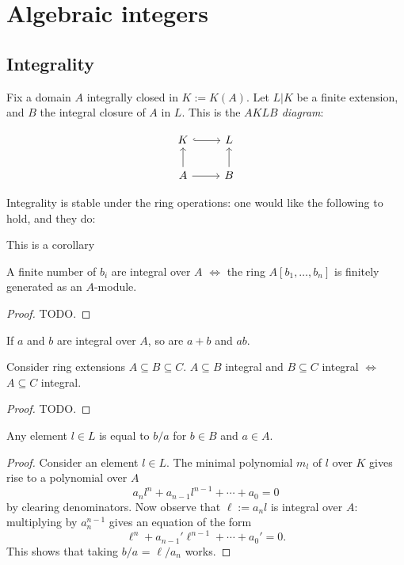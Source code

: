 \documentclass{memoir}
\begin{document}
\chapter{Algebraic integers}

\section{Integrality}

Fix a domain $A$ integrally closed in $K := K(A)$. Let $L|K$ be a finite
extension, and $B$ the integral closure of $A$ in $L$. This is the \emph{$AKLB$
  diagram}:

\[
  \begin{tikzcd}
    K \arrow[r, hook] & L \\
    A \arrow[u] \arrow[r] & B \arrow[u]
  \end{tikzcd}
\]

Integrality is stable under the ring operations: one would like the following to
hold, and they do:

This is a corollary

\begin{theorem}{\label{module-integrality}}
  A finite number of $b_i$ are integral over $A$ $\iff$ the ring $A[b_1,\ldots,b_n]$ is
  finitely generated as an $A$-module.
\end{theorem}
\begin{proof}
  TODO.
\end{proof}

\begin{corollary}{\label{integrality-of-sums-products}}
  If $a$ and $b$ are integral over $A$, so are $a + b$ and $ab$.
\end{corollary}

\begin{theorem}{\label{integrality-trans}}
  Consider ring extensions $A \subseteq B \subseteq C$.
  $A \subseteq B$ integral and $B \subseteq C$ integral $\iff$ $A \subseteq C$ integral.
\end{theorem}
\begin{proof}
  TODO.
\end{proof}

\begin{theorem}
  Any element $l \in L$ is equal to $b/a$ for $b \in B$ and $a \in A$.
\end{theorem}

\begin{proof}
  Consider an element $l \in L$. The minimal polynomial $m_l$ of $l$ over $K$
  gives rise to a polynomial over $A$
  \[ a_nl^n + a_{n-1}l^{n-1} + \cdots + a_0 = 0 \] by clearing denominators. Now
  observe that $\ell := a_nl$ is integral over $A$: multiplying by $a_n^{n-1}$
  gives an equation of the form
  \[ \ell^n + a_{n-1}'\ell^{n-1} + \cdots + a_0' = 0. \] This shows that taking
  $b/a$ = $\ell/a_n$ works.
\end{proof}
\end{document}
